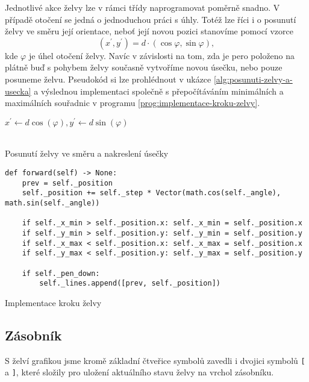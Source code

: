 Jednotlivé akce želvy lze v rámci třídy naprogramovat poměrně snadno. V případě otočení se jedná o jednoduchou práci s úhly. Totéž lze říci i o posunutí želvy ve směru její orientace, neboť její novou pozici stanovíme pomocí vzorce
\[(x^\prime,y^\prime)=d\cdot(\cos\varphi,\sin\varphi),\]
kde $\varphi$ je úhel otočení želvy. Navíc v závislosti na tom, zda je pero položeno na plátně buď s pohybem želvy současně vytvoříme novou úsečku, nebo pouze posuneme želvu. Pseudokód si lze prohlédnout v ukázce \ref{alg:posunuti-zelvy-a-usecka} a výslednou implementaci společně s přepočítáváním minimálních a maximálních souřadnic v programu \ref{prog:implementace-kroku-zelvy}.
\begin{algorithm}[h]
    $x^\prime\gets d\cos(\varphi),y^\prime\gets d\sin(\varphi)$\\
    \\
    \caption{Posunutí želvy ve směru a nakreslení úsečky}
    \label{alg:posunuti-zelvy-a-usecka}
\end{algorithm}
\begin{program}[h]
\begin{lstlisting}[style=python]
def forward(self) -> None:
    prev = self._position
    self._position += self._step * Vector(math.cos(self._angle), math.sin(self._angle))

    if self._x_min > self._position.x: self._x_min = self._position.x
    if self._y_min > self._position.y: self._y_min = self._position.y
    if self._x_max < self._position.x: self._x_max = self._position.x
    if self._y_max < self._position.y: self._y_max = self._position.y

    if self._pen_down:
        self._lines.append([prev, self._position])
\end{lstlisting}
    \caption{Implementace kroku želvy}
    \label{prog:implementace-kroku-zelvy}
\end{program}

\subsection{Zásobník}\label{subsec:zasobnik}

S želví grafikou jsme kromě základní čtveřice symbolů zavedli i dvojici symbolů \texttt{[} a \texttt{]}, které složily pro uložení aktuálního stavu želvy na vrchol zásobníku.

